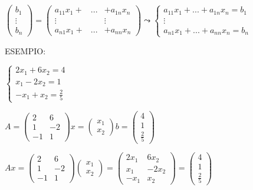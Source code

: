 \documentclass[12pt]{article}
\begin{document}
\begin{center}
    $\begin{pmatrix}
        b_1\\
        \vdots\\
        b_n
    \end{pmatrix} =
    \begin{pmatrix}
        a_{11}x_1 + & ... & + a_{1n}x_n\\
        \vdots & & \vdots\\
        a_{n1}x_1 + & ... & + a_{nn}x_n
    \end{pmatrix} \leadsto \begin{cases}
            a_{11}x_1 + ... + a_{1n}x_n = b_1\\
            \vdots\\
            a_{n1}x_1 + ... + a_{nn}x_n = b_n
        \end{cases}$
\end{center}
ESEMPIO:
\begin{center}
    $\begin{cases}
        2x_1 + 6x_2 = 4\\
        x_1 - 2x_2 = 1\\
        -x_1 + x_2 = \frac{2}{5}
    \end{cases}$
\end{center}

\begin{center}
    $A = \begin{pmatrix}
        2 & 6\\
        1 & -2\\
        -1 & 1
    \end{pmatrix} x = \begin{pmatrix}
        x_1\\
        x_2
    \end{pmatrix} b = \begin{pmatrix}
        4\\
        1\\
        \frac{2}{5}
    \end{pmatrix}$
\end{center}

\begin{center}
$Ax = \begin{pmatrix}
        2 & 6\\
        1 & -2\\
        -1 & 1
    \end{pmatrix}\begin{pmatrix}
        x_1\\
        x_2
    \end{pmatrix} = \begin{pmatrix}
        2x_1 & 6x_2\\
        x_1 & -2x_2\\
        -x_1 & x_2
    \end{pmatrix} = \begin{pmatrix}
        4\\
        1\\
        \frac{2}{5}
    \end{pmatrix}$
\end{center}
\end{document}
